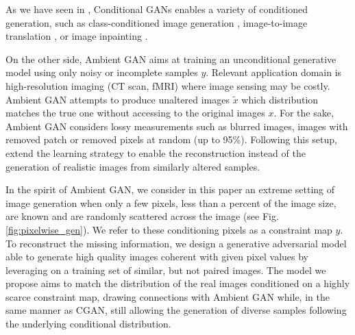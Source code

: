 
As we have seen in , Conditional GANs enables a variety of conditioned generation, such as class-conditioned image generation \citep{Mirza2014}, image-to-image translation \citep{Isola2016, Wang2018}, or image inpainting \citep{Pathak2016}.

 On the other side, Ambient GAN \citep{Bora2018} aims at training an unconditional generative model using only noisy or incomplete samples $y$. Relevant application domain is high-resolution imaging (CT scan, fMRI) where image sensing may be costly. Ambient GAN attempts to produce unaltered images $\tilde{x}$ which distribution matches the true one without accessing to the original images $x$. For the sake, Ambient GAN considers lossy measurements such as blurred images, images with removed patch or removed pixels at random (up to 95\%). Following this setup, \citet{Pajot2019} extend the learning strategy to enable the reconstruction instead of the generation of realistic images from similarly altered samples. 

In the spirit of Ambient GAN,  we consider in this paper an extreme setting of image generation when only a few pixels, less than a percent of the  image size, are known and are randomly scattered across the image (see Fig.\ref{fig:pixelwise_gen}). We refer to these conditioning pixels as a constraint map $y$. To reconstruct the missing information, we design a generative adversarial model able to generate high quality images coherent with given pixel values by leveraging on a training set of similar, but not paired images. The model we propose aims to match the distribution of the real images conditioned on a highly scarce constraint map, drawing connections with Ambient GAN while, in the same manner as CGAN, still allowing the generation of diverse samples following the underlying conditional distribution. 

